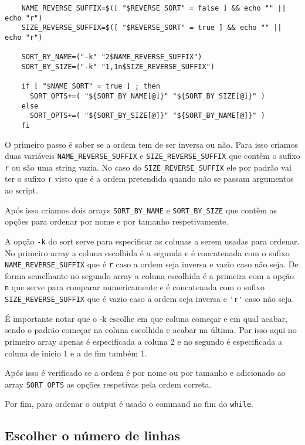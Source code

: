 {\begin{listing}[H]
	\centering
	\begin{verbatim}
    NAME_REVERSE_SUFFIX=$([ "$REVERSE_SORT" = false ] && echo "" || echo "r")
    SIZE_REVERSE_SUFFIX=$([ "$REVERSE_SORT" = true ] && echo "" || echo "r")

    SORT_BY_NAME=("-k" "2$NAME_REVERSE_SUFFIX")
    SORT_BY_SIZE=("-k" "1,1n$SIZE_REVERSE_SUFFIX")

    if [ "$NAME_SORT" = true ] ; then
      SORT_OPTS+=( "${SORT_BY_NAME[@]}" "${SORT_BY_SIZE[@]}" )
    else
      SORT_OPTS+=( "${SORT_BY_SIZE[@]}" "${SORT_BY_NAME[@]}" )
    fi
  \end{verbatim}
\end{listing}

O primeiro passo é saber se a ordem tem de ser inversa ou não.
Para isso criamos duas variáveis \Verb|NAME_REVERSE_SUFFIX| e \Verb|SIZE_REVERSE_SUFFIX| que contêm o sufixo \Verb|r| ou são uma string vazia.
No caso do \Verb|SIZE_REVERSE_SUFFIX| ele por padrão vai ter o sufixo \Verb|r| visto que é a ordem pretendida quando não se passam argumentos ao script.

Após isso criamos dois arrays \Verb|SORT_BY_NAME| e \Verb|SORT_BY_SIZE| que contêm as opções para ordenar por nome e por tamanho respetivamente.

A opção \Verb|-k| do sort serve para especificar as colunas a serem usadas para ordenar.
No primeiro array a coluna escolhida é a segunda e é concatenada com o sufixo \Verb|NAME_REVERSE_SUFFIX| que é \Verb|r| caso a ordem seja inversa e vazio caso não seja.
De forma semelhante no segundo array a coluna escolhida é a primeira com a opção \Verb|n| que serve para comparar numericamente e é concatenada com o sufixo \Verb|SIZE_REVERSE_SUFFIX| que é vazio caso a ordem seja inversa e \Verb|'r'| caso não seja.

É importante notar que o -k escolhe em que coluna começar e em qual acabar, sendo o padrão começar na coluna escolhida e acabar na última.
Por isso aqui no primeiro array apenas é especificada a coluna 2 e no segundo é especificada a coluna de inicio 1 e a de fim também 1.

Após isso é verificado se a ordem é por nome ou por tamanho e adicionado ao array \Verb|SORT_OPTS| as opções respetivas pela ordem correta.

Por fim, para ordenar o output é usado o command  no fim do \Verb|while|.

\subsection{Escolher o número de linhas}\label{sec:head}

}
